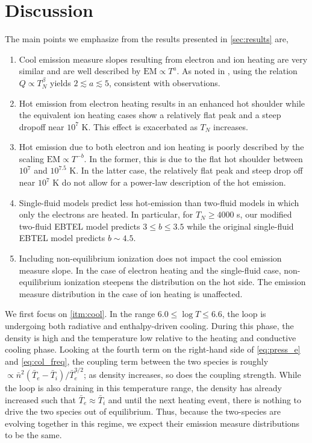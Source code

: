\documentclass[apj]{emulateapj}
\begin{document}
	\section{Discussion}
	\label{sec:discussion}
	\par The main points we emphasize from the results presented in \autoref{sec:results} are,
	\begin{enumerate}
		\item Cool emission measure slopes resulting from electron and ion heating are very similar and are well described by $\mathrm{EM}\propto T^a$. As noted in \citet{cargill_active_2014}, using the relation $Q\propto T_N^{\beta}$ yields $2\lesssim a\lesssim5$, consistent with observations.\label{itm:cool}
		\item Hot emission from electron heating results in an enhanced hot shoulder while the equivalent ion heating cases show a relatively flat peak and a steep dropoff near $10^7$ K. This effect is exacerbated as $T_N$ increases.\label{itm:hot}
		\item Hot emission due to both electron and ion heating is poorly described by the scaling $\mathrm{EM}\propto T^{-b}$. In the former, this is due to the flat hot shoulder between $10^7$ and $10^{7.5}$ K. In the latter case, the relatively flat peak and steep drop off near $10^7$ K do not allow for a power-law description of the hot emission.\label{itm:deriv}
		\item Single-fluid models predict less hot-emission than two-fluid models in which only the electrons are heated. In particular, for $T_N\ge4000$ s, our modified two-fluid EBTEL model predicts $3\le b\le3.5$ while the original single-fluid EBTEL model predicts $b\sim4.5$.\label{itm:histos}
		\item Including non-equilibrium ionization does not impact the cool emission measure slope. In the case of electron heating and the single-fluid case, non-equilibrium ionization steepens the distribution on the hot side. The emission measure distribution in the case of ion heating is unaffected. \label{itm:nei}
	\end{enumerate}
	\par We first focus on \autoref{itm:cool}. In the range $6.0\le\log{T}\le6.6$, the loop is undergoing both radiative and enthalpy-driven cooling. During this phase, the density is high and the temperature low relative to the heating and conductive cooling phase. Looking at the fourth term on the right-hand side of \autoref{eq:press_e} and \autoref{eq:col_freq}, the coupling term between the two species is roughly $\propto\bar{n}^2(\bar{T}_e-\bar{T}_i)/\bar{T}_e^{3/2}$; as density increases, so does the coupling strength. While the loop is also draining in this temperature range, the density has already increased such that $\bar{T}_e\approx\bar{T}_i$ and until the next heating event, there is nothing to drive the two species out of equilibrium. Thus, because the two-species are evolving together in this regime, we expect their emission measure distributions to be the same.
\end{document}
